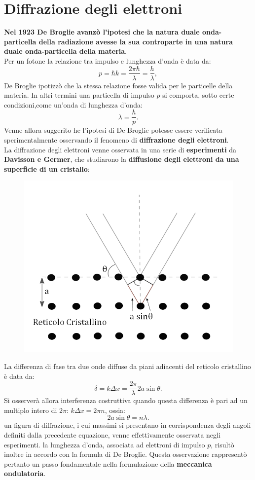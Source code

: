 \documentclass[a4paper,12pt,oneside]{book}
\begin{document}
\section{Diffrazione degli elettroni}
\textbf{Nel 1923 De Broglie avanzò l'ipotesi che la natura duale onda-particella della radiazione avesse la sua controparte in una natura duale onda-particella della materia}.\\
Per un fotone la relazione tra impulso e lunghezza d'onda è data da:
\begin{equation}
p= \hbar k = \frac{2\pi \hbar}{\lambda}=\frac{h}{\lambda},
\end{equation}
De Broglie ipotizzò che la stessa relazione fosse valida per le particelle della materia. In altri termini una particella di impulso $p$ si comporta, sotto certe condizioni,come un'onda di lunghezza d'onda:
\begin{equation}
\lambda=\frac{h}{p}.
\end{equation}
Venne allora suggerito he l'ipotesi di De Broglie potesse essere verificata sperimentalmente osservando il fenomeno di \textbf{diffrazione degli elettroni}.\\
La diffrazione degli elettroni venne osservata in una serie di \textbf{esperimenti} da \textbf{Davisson e Germer}, che studiarono la \textbf{diffusione degli elettroni da una superficie di un cristallo}:
\newpage
\begin{figure}[!htbp]
\begin{center}
\includegraphics[width=.65\textwidth]{immagini/cap_1/fig_1_5.png}
\end{center}
\end{figure}
La differenza di fase tra due onde diffuse  da piani adiacenti del reticolo cristallino è data da:
\begin{equation}
\delta = k \Delta x = \frac{2 \pi}{\lambda} 2a \sin \theta.
\end{equation}
Si osserverà allora interferenza costruttiva quando questa differenza è pari ad un multiplo intero di $2 \pi$: $k \Delta x = 2 \pi n$, ossia:
\begin{equation}
2a \sin \theta = n\lambda.
\end{equation}
un figura di diffrazione, i cui massimi si presentano in corrispondenza degli angoli definiti dalla precedente equazione, venne effettivamente osservata negli esperimenti. la lunghezza d'onda, associata ad elettroni di impulso $p$, risultò inoltre in accordo con la formula di De Broglie. Questa osservazione rappresentò pertanto un passo fondamentale nella formulazione della \textbf{meccanica ondulatoria}.
\end{document}

